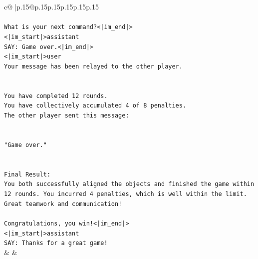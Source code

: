 \documentclass{article}
\begin{document}
{\begin{supertabular}{c@{$\;$}|p{.15\linewidth}@{}p{.15\linewidth}p{.15\linewidth}p{.15\linewidth}p{.15\linewidth}p{.15\linewidth}}
{{{\\ 
\\ 
\texttt{What is your next command?<|im\_end|>} \\
\texttt{<|im\_start|>assistant} \\
\texttt{SAY: Game over.<|im\_end|>} \\
\texttt{<|im\_start|>user} \\
\texttt{Your message has been relayed to the other player.} \\
\\ 
\\ 
\texttt{You have completed 12 rounds.} \\
\texttt{You have collectively accumulated 4 of 8 penalties.} \\
\texttt{The other player sent this message:} \\
\\ 
\\ 
\texttt{"Game over."} \\
\\ 
\\ 
\texttt{Final Result:} \\
\texttt{You both successfully aligned the objects and finished the game within 12 rounds. You incurred 4 penalties, which is well within the limit. Great teamwork and communication!} \\
\\ 
\texttt{Congratulations, you win!<|im\_end|>} \\
\texttt{<|im\_start|>assistant} \\
\texttt{SAY: Thanks for a great game!} \\
            }
        }
    }
    & & \\ \\


\end{supertabular}}
\end{document}
